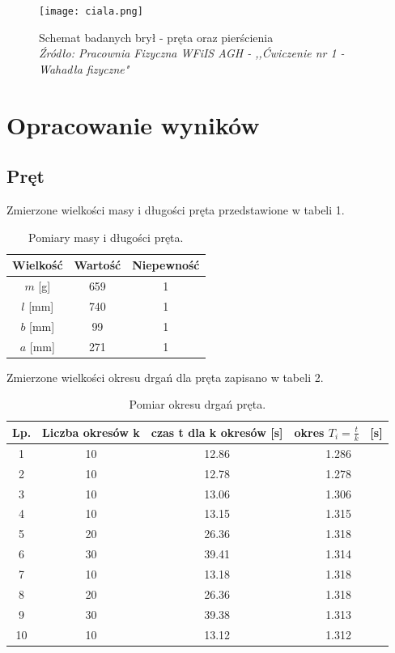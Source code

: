\documentclass[a4paper,12pts]{article}
\begin{document}
	\begin{figure}[!h]
		\centering
		\texttt{[image: ciala.png]}
		\caption{\centering Schemat badanych brył - pręta oraz pierścienia \\ \textit{Źródło: Pracownia Fizyczna WFiIS AGH - ,,Ćwiczenie nr 1 - Wahadła fizyczne"}}
		\label{ciala}
	\end{figure}


	\section{Opracowanie wyników}
	
	\subsection{Pręt}
	
	Zmierzone wielkości masy i długości pręta przedstawione w tabeli 1.
	
		\begin{table}[!h]
		\centering
		\begin{tabular}{ | c | c | c | }
			\hline
			\textrm{Wielkość} & \textrm{Wartość} & \textrm{Niepewność} \\ \hline
			$m$ [g] & 659 & 1  \\ \hline
			$l$ [mm] & 740 & 1  \\ \hline
			$b$ [mm] & 99 & 1  \\ \hline
			$a$ [mm]& 271 & 1  \\ \hline

		\end{tabular}
		\caption{Pomiary masy i długości pręta.}
		\label{Tabela1}	
	\end{table}
	
	Zmierzone wielkości okresu drgań dla pręta zapisano w tabeli 2.
	
	\begin{table}[!h]
		\centering
		\begin{tabular}{ | c | c | c | c | }
			\hline
			\textrm{Lp.} & \textrm{Liczba okresów } k & \textrm{czas } t \textrm{ dla } k \textrm{ okresów [s]} & \textrm{okres } $T_i= \frac{t}{k}$ \textrm{~[s]} \\ \hline
			1 & 10 & 12.86 & 1.286 \\ \hline
			2 & 10 & 12.78 & 1.278 \\ \hline
			3 & 10 & 13.06 & 1.306 \\ \hline
			4 & 10 & 13.15 & 1.315 \\ \hline
			5 & 20 & 26.36 & 1.318 \\ \hline
			6 & 30 & 39.41 & 1.314 \\ \hline
			7 & 10 & 13.18 & 1.318 \\ \hline
			8 & 20 & 26.36 & 1.318 \\ \hline
			9 & 30 & 39.38 & 1.313 \\ \hline
			10 & 10 & 13.12 & 1.312 \\ \hline
		\end{tabular}
		\caption{Pomiar okresu drgań pręta.}
		\label{Tabela2}	
	\end{table}
	
\end{document}
